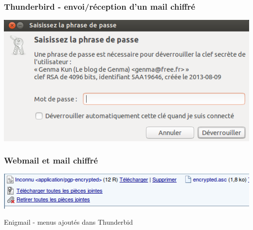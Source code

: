 \documentclass{beamer}
\begin{document}
\begin{frame}
\frametitle{Thunderbird - envoi/réception d'un mail chiffré}
\begin{center}
\includegraphics[scale=0.5] {./images/Thunderbird03.png}\end{center}
\begin{itemize}
\end{itemize}
\end{frame}

\begin{frame}
\frametitle{Webmail et mail chiffré}
\begin{center}
\includegraphics[scale=0.5] {./images/Zimbra.png}\end{center}
\end{frame}


\begin{frame}
\begin{center}
\Huge{Enigmail - menus ajoutés dans Thunderbid}
\end{center}
\end{frame}
\end{document}
